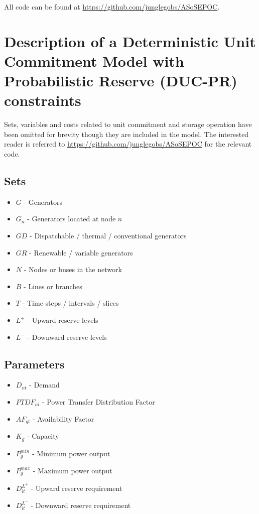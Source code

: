 \documentclass[number,times]{elsarticle}
\begin{document}
All code can be found at \href{https://github.com/junglegobs/ASoSEPOC}{https://github.com/junglegobs/ASoSEPOC}.

\section{Description of a Deterministic Unit Commitment Model with Probabilistic Reserve (DUC-PR) constraints}

Sets, variables and costs related to unit commitment and storage operation have been omitted for brevity though they are included in the model. The interested reader is referred to \href{https://github.com/junglegobs/ASoSEPOC}{https://github.com/junglegobs/ASoSEPOC} for the relevant code.

\subsection{Sets}

\begin{itemize}
    \item $G$ - Generators
    \item $G_n$ - Generators located at node $n$
    \item $GD$ - Dispatchable / thermal / conventional generators
    \item $GR$ - Renewable / variable generators
    \item $N$ - Nodes or buses in the network
    \item $B$ - Lines or branches
    \item $T$ - Time steps / intervals / slices
    \item $L^+$ - Upward reserve levels
    \item $L^-$ - Downward reserve levels
\end{itemize}

\subsection{Parameters}

\begin{itemize}
    \item $D_{nt}$ - Demand
    \item $PTDF_{nl}$ - Power Transfer Distribution Factor
    \item $AF_{gt}$ - Availability Factor
    \item $K_g$ - Capacity
    \item $P^{min}_g$ - Minimum power output
    \item $P^{max}_g$ - Maximum power output
    \item $D^{L^+}_{lt}$ - Upward reserve requirement
    \item $D^{L^-}_{lt}$ - Downward reserve requirement
\end{itemize}
\end{document}
